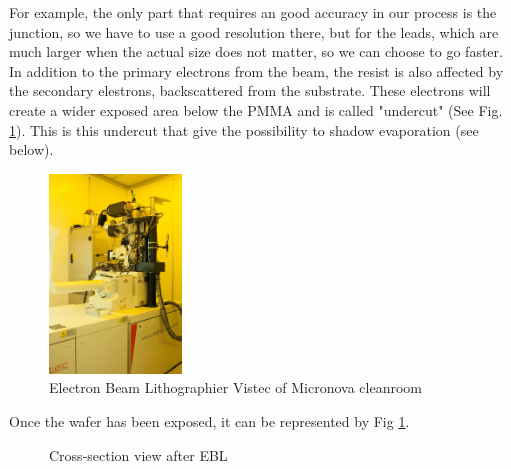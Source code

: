             For example, the only part that requires an good accuracy in our process is the junction, so we have to use a good resolution there, but for the leads, which are much larger when the actual size does not matter, so we can choose to go faster. 
            In addition to the primary electrons from the beam, the resist is also affected by the secondary elestrons, backscattered from the substrate. These electrons will create a wider exposed area below the PMMA and is called "undercut" (See Fig. \ref{waferEBL}). This is this undercut that give the possibility to shadow evaporation (see below).
            
            \label{explicationebl}
                    
            \begin{figure}
                \centering
                \includegraphics[width=100pt]{EBL.jpg}
                \caption{Electron Beam Lithographier Vistec of Micronova cleanroom}
            \end{figure}
            
            Once the wafer has been exposed, it can be represented by Fig \ref{waferEBL}.
                    
            \begin{figure}
                \centering
                \caption{Cross-section view after EBL}
                \label{waferEBL}
            \end{figure}
        
